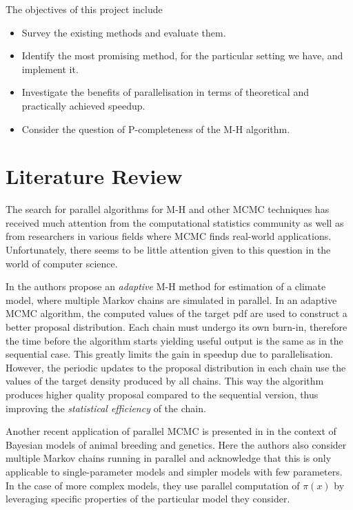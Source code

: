 \documentclass[11pt]{article}       %
\begin{document}
The objectives of this project include
\begin{itemize}
\item Survey the existing methods and evaluate them.
\item Identify the most promising method, for the particular setting we have, and implement it.
\item Investigate the benefits of parallelisation in terms of theoretical and
     practically achieved speedup.
\item Consider the question of P-completeness of the M-H algorithm.
\end{itemize}


\section{Literature Review} \label{litrev}

The search for parallel algorithms for M-H and other MCMC techniques has received
much attention from the computational statistics community as well as from 
researchers in various fields where MCMC finds real-world applications.  
Unfortunately, there seems to be little attention given to this question 
in the world of computer science.

In \cite{solonen2012efficient} the authors propose an \emph{adaptive} M-H
method for estimation of a climate model, where multiple Markov chains are
simulated in parallel.  In an adaptive MCMC algorithm, the computed values of
the target pdf are used to construct a better proposal distribution.  Each
chain must undergo its own burn-in, therefore the time before the algorithm
starts yielding useful output is the same as in the sequential case.  This
greatly limits the gain in speedup due to parallelisation.  However, the
periodic updates to the proposal distribution in each chain use the values of
the target density produced by all chains.  This way the algorithm produces
higher quality proposal compared to the sequential version, thus improving the
\emph{statistical efficiency} of the chain.

Another recent application of parallel MCMC is presented in
\cite{wu2012parallel} in the context of Bayesian models of animal breeding and
genetics.  Here the authors also consider multiple Markov chains running in
parallel and acknowledge that this is only applicable to single-parameter
models and simpler models with few parameters.  In the case of more complex
models, they use parallel computation of $\pi(x)$ by leveraging specific
properties of the 
particular model they consider.
\end{document}
